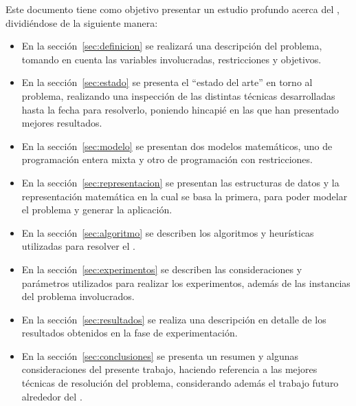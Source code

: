 \documentclass[../informe2.tex]{subfiles}
\begin{document}
\bigskip
Este documento tiene como objetivo presentar un estudio profundo acerca del \mrp, dividiéndose de la siguiente manera:
\begin{itemize}
	\item En la sección~\ref{sec:definicion} se realizará una descripción del problema, tomando en cuenta las variables involucradas, restricciones y objetivos.
	\item En la sección~\ref{sec:estado} se presenta el ``estado del arte'' en torno al problema, realizando una inspección de las distintas técnicas desarrolladas hasta la fecha para resolverlo, poniendo hincapié en las que han presentado mejores resultados.
	\item En la sección~\ref{sec:modelo} se presentan dos modelos matemáticos, uno de programación entera mixta y otro de programación con restricciones.
	\item En la sección~\ref{sec:representacion} se presentan las estructuras de datos y la representación matemática en la cual se basa la primera, para poder modelar el problema y generar la aplicación.
	\item En la sección~\ref{sec:algoritmo} se describen los algoritmos y heurísticas utilizadas para resolver el \mrp.
	\item En la sección~\ref{sec:experimentos} se describen las consideraciones y parámetros utilizados para realizar los experimentos, además de las instancias del problema involucrados.
	\item En la sección~\ref{sec:resultados} se realiza una descripción en detalle de los resultados obtenidos en la fase de experimentación.
	\item En la sección~\ref{sec:conclusiones} se presenta un resumen y algunas consideraciones del presente trabajo, haciendo referencia a las mejores técnicas de resolución del problema, considerando además el trabajo futuro alrededor del \mrp.
\end{itemize}
\end{document}
